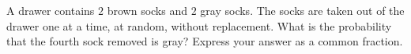 A drawer contains $2$ brown socks and $2$ gray socks. The socks are taken out of the drawer one at a time, at random, without replacement. What is the probability that the fourth sock removed is gray? Express your answer as a common fraction.
